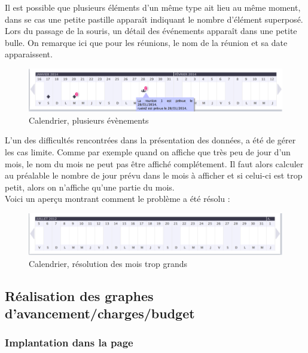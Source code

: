 \documentclass[12pt]{report}
\begin{document}
Il est possible que plusieurs éléments d’un même type ait lieu au même moment, dans se cas une petite pastille apparaît indiquant le nombre d’élément superposé. Lors du passage de la souris, un détail des événements apparaît dans une petite bulle. On remarque ici que pour les réunions, le nom de la réunion et sa date apparaissent.\\
	
\begin{figure}[H]
	\centering
	\includegraphics[width=1\textwidth]{pictures/matthieu/m_calendar_2.png}
	\caption{Calendrier, plusieurs évènements}
	\label{m3}
\end{figure}
	
	L’un des difficultés rencontrées dans la présentation des données, a été de gérer les cas limite. Comme par exemple quand on affiche que très peu de jour d’un mois, le nom du mois ne peut pas être affiché complétement. Il faut alors calculer au préalable le nombre de jour prévu dans le mois à afficher et si celui-ci est trop petit, alors on n’affiche qu’une partie du mois.\\

Voici un aperçu montrant comment le problème a été résolu :\\
	
	\begin{figure}[H]
	\centering
	\includegraphics[width=1\textwidth]{pictures/matthieu/m_calendar_3.png}
	\caption{Calendrier, résolution des mois trop grands}
	\label{m4}
\end{figure}

	\subsection{Réalisation des graphes d'avancement/charges/budget}
	
	\subsubsection{Implantation dans la page}
	
\end{document}
